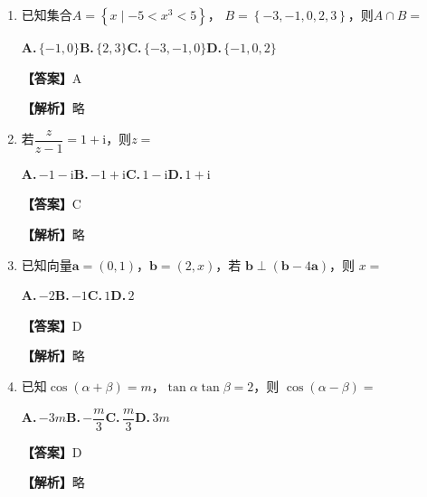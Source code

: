 \documentclass[UTF8,a4paper]{ctexart}
\renewcommand{\i}{\mathrm{i}}
\begin{document}
\begin{enumerate}[series=s0, leftmargin=2em, itemsep=0.8em]


\item
已知集合$A=\left\{x\mid-5<x^3<5\right\}$， $B=\left\{-3,-1,0,2,3\right\}$，则$A\cap B=$


\noindent\textbf{A.}\,$\{-1,0\}$\quad\textbf{B.}\,$\{2,3\}$\quad\textbf{C.}\,$\{-3,-1,0\}$\quad\textbf{D.}\,$\{-1,0,2\}$
\par\smallskip



\par\noindent\textbf{【答案】}A
\par\noindent\textbf{【解析】}略



\item
若$\dfrac{z}{z-1}=1+\i$，则$z=$


\noindent\textbf{A.}\,$-1-\i$\quad\textbf{B.}\,$-1+\i$\quad\textbf{C.}\,$1-\i$\quad\textbf{D.}\,$1+\i$
\par\smallskip



\par\noindent\textbf{【答案】}C
\par\noindent\textbf{【解析】}略



\item
已知向量$\boldsymbol a=(0,1)$，$\boldsymbol b=(2,x)$，若 $\boldsymbol b\perp (\boldsymbol b-4\boldsymbol a)$，则 $x=$


\noindent\textbf{A.}\,$-2$\quad\textbf{B.}\,$-1$\quad\textbf{C.}\,$1$\quad\textbf{D.}\,$2$
\par\smallskip



\par\noindent\textbf{【答案】}D
\par\noindent\textbf{【解析】}略



\item
已知$\cos(\alpha+\beta)=m$，$\tan\alpha\tan\beta=2$，则 $\cos(\alpha-\beta)=$


\noindent\textbf{A.}\,$-3m$\quad\textbf{B.}\,$-\dfrac{m}{3}$\quad\textbf{C.}\,$\dfrac{m}{3}$\quad\textbf{D.}\,$3m$
\par\smallskip



\par\noindent\textbf{【答案】}D
\par\noindent\textbf{【解析】}略




\end{enumerate}
\end{document}
